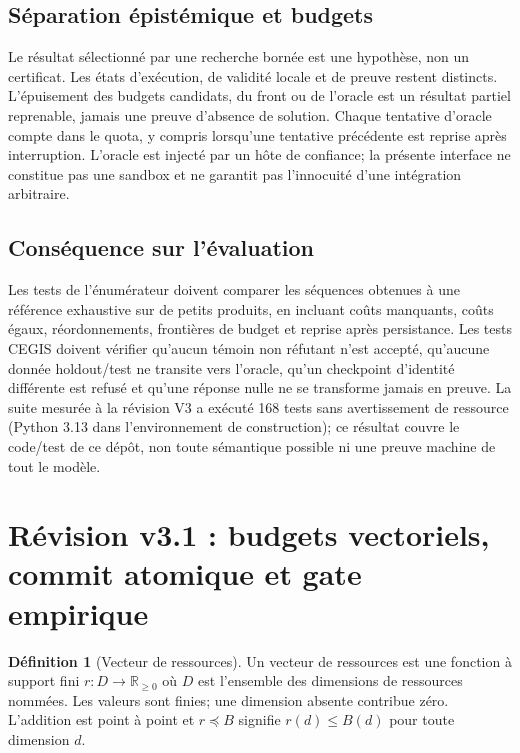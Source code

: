 \documentclass[11pt,a4paper]{article}
\theoremstyle{definition}
\newtheorem{definition}{Définition}[section]
\theoremstyle{plain}
\theoremstyle{remark}
\begin{document}
\subsection{Séparation épistémique et budgets}
Le résultat sélectionné par une recherche bornée est une hypothèse, non un certificat. Les états d'exécution, de validité locale et de preuve restent distincts. L'épuisement des budgets candidats, du front ou de l'oracle est un résultat partiel reprenable, jamais une preuve d'absence de solution. Chaque tentative d'oracle compte dans le quota, y compris lorsqu'une tentative précédente est reprise après interruption. L'oracle est injecté par un hôte de confiance; la présente interface ne constitue pas une sandbox et ne garantit pas l'innocuité d'une intégration arbitraire.

\subsection{Conséquence sur l'évaluation}
Les tests de l'énumérateur doivent comparer les séquences obtenues à une référence exhaustive sur de petits produits, en incluant coûts manquants, coûts égaux, réordonnements, frontières de budget et reprise après persistance. Les tests CEGIS doivent vérifier qu'aucun témoin non réfutant n'est accepté, qu'aucune donnée holdout/test ne transite vers l'oracle, qu'un checkpoint d'identité différente est refusé et qu'une réponse nulle ne se transforme jamais en preuve. La suite mesurée à la révision V3 a exécuté 168 tests sans avertissement de ressource (Python 3.13 dans l'environnement de construction); ce résultat couvre le code/test de ce dépôt, non toute sémantique possible ni une preuve machine de tout le modèle.



\section{Révision v3.1 : budgets vectoriels, commit atomique et gate empirique}
\label{sec:theory-v31-ascrc}

\begin{definition}[Vecteur de ressources]
Un vecteur de ressources est une fonction à support fini $r:D\to\mathbb{R}_{\geq0}$ où $D$ est l'ensemble des dimensions de ressources nommées. Les valeurs sont finies; une dimension absente contribue zéro. L'addition est point à point et $r\preceq B$ signifie $r(d)\leq B(d)$ pour toute dimension $d$.
\end{definition}
\end{document}
